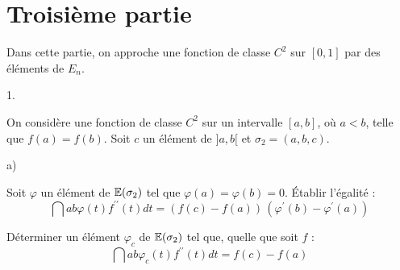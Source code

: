 \documentclass[11pt]{article}%
\begin{document}
\section*{Troisième partie}

Dans cette partie, on approche une fonction de classe $C^{2}$ sur
$[0,1]$
par des éléments de $E_{n}$.

\begin{noliste}{1.}
 \setlength{\itemsep}{4mm}
\item On considère une fonction de classe $C^{2}$ sur un intervalle
$[a,b]$,
où $a<b$, telle que $f(a) = f(b)$. Soit $c$ un élément de $]a,b[$ et
$\sigma
_{2} = (a,b,c)$.

\begin{noliste}{a)}
 \setlength{\itemsep}{2mm}
\item Soit $\varphi $ un élément de $\mathbb{E}(\sigma_{2})$ tel que $\varphi
(a) = \varphi (b) = 0$. Établir l'égalité : 
\[
\dint{a}{b}\varphi (t)f^{\prime \prime }(t)dt = \left(
f(c)-f(a)\right) \,\left( \varphi ^{\prime }(b)-\varphi ^{\prime
}(a)\right)
\]

\item Déterminer un élément $\varphi_{c}$ de $\mathbb{E}(\sigma_{2})$ tel que,
quelle que soit $f$ : 
\[
\dint{a}{b}\varphi_{c}(t)f^{\prime \prime }(t)dt = f(c)-f(a)
\]
\end{noliste}
\end{noliste}

\label{fin}
\end{document}
